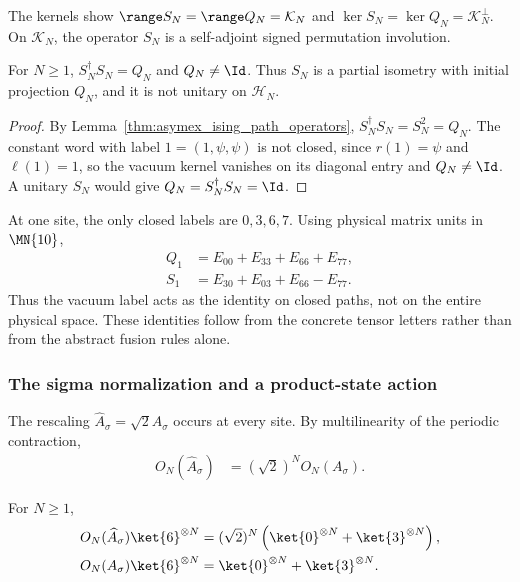 The kernels show
$\range S_N=\range Q_N=\mathcal K_N$ and
$\ker S_N=\ker Q_N=\mathcal K_N^\perp$. On $\mathcal K_N$, the operator
$S_N$ is a self-adjoint signed permutation involution.

\begin{corollary}%
    \label{cor:asymex_ising_fermion_partial_isometry}
    \leanok
    For $N\geq1$, $S_N^\dagger S_N=Q_N$ and $Q_N\neq\Id$. Thus $S_N$ is
    a partial isometry with initial projection $Q_N$, and it is not
    unitary on $\mathcal H_N$.
\end{corollary}

\begin{proof}
    \leanok
    By Lemma~\ref{thm:asymex_ising_path_operators},
    $S_N^\dagger S_N=S_N^2=Q_N$. The constant word with label
    $1=(1,\psi,\psi)$ is not closed, since $r(1)=\psi$ and
    $\ell(1)=1$, so the vacuum kernel vanishes on its diagonal entry
    and $Q_N\neq\Id$. A unitary $S_N$ would give $Q_N=S_N^\dagger S_N=\Id$.
\end{proof}
At one site, the only closed labels are $0,3,6,7$. Using physical
matrix units in $\MN{10}$,
\begin{align}
    Q_1 & =E_{00}+E_{33}+E_{66}+E_{77}, \\
    S_1 & =E_{30}+E_{03}+E_{66}-E_{77}.
\end{align}
Thus the vacuum label acts as the identity on closed paths, not on
the entire physical space. These identities follow from the concrete
tensor letters rather than from the abstract fusion rules alone.

\subsubsection{The sigma normalization and a product-state action}

The rescaling $\widehat A_\sigma=\sqrt2A_\sigma$ occurs at every site.
By multilinearity of the periodic contraction,
\begin{align}
    O_N(\widehat A_\sigma) & =(\sqrt2)^N O_N(A_\sigma).
    \label{eq:asymex_ising_sigma_scale}
\end{align}

\begin{lemma}%
    \label{thm:asymex_ising_sigma_product}
    \leanok
    For $N\geq1$,
    \begin{align}
        O_N(\widehat A_\sigma)\ket{6}^{\otimes N}
         & =(\sqrt2)^N
        \left(\ket{0}^{\otimes N}+\ket{3}^{\otimes N}\right),
        \label{eq:asymex_ising_sigma_product}        \\
        O_N(A_\sigma)\ket{6}^{\otimes N}
         & =\ket{0}^{\otimes N}+\ket{3}^{\otimes N}.
    \end{align}
\end{lemma}

